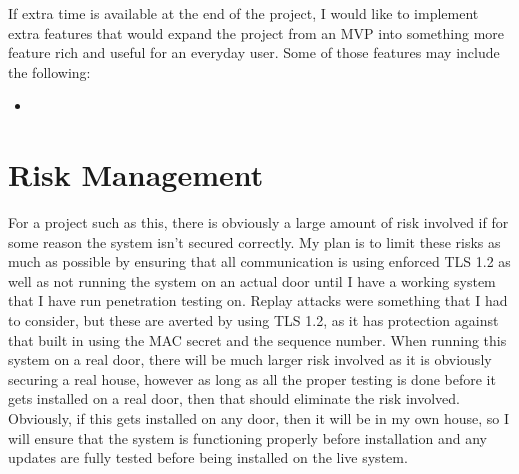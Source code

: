 If extra time is available at the end of the project, I would like to implement extra features that would expand the project from an MVP into something more feature rich and useful for an everyday user. Some of those features may include the following:

\begin{itemize}
	\item
\end{itemize}


\section{Risk Management}
For a project such as this, there is obviously a large amount of risk involved if for some reason the system isn't secured correctly. My plan is to limit these risks as much as possible by ensuring that all communication is using enforced TLS 1.2 as well as not running the system on an actual door until I have a working system that I have run penetration testing on. Replay attacks were something that I had to consider, but these are averted by using TLS 1.2, as it has protection against that built in using the MAC secret and the sequence number. When running this system on a real door, there will be much larger risk involved as it is obviously securing a real house, however as long as all the proper testing is done before it gets installed on a real door, then that should eliminate the risk involved. Obviously, if this gets installed on any door, then it will be in my own house, so I will ensure that the system is functioning properly before installation and any updates are fully tested before being installed on the live system.

